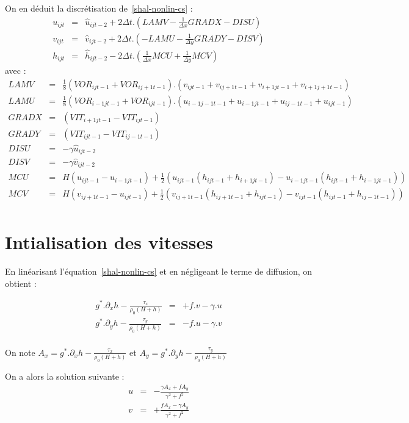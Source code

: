 \documentclass[a4paper,12pt]{article}
\begin{document}
On en déduit la discrétisation de~\ref{shal-nonlin-cs} :
\begin{eqnarray*}
u_{ijt} & = & \hat{u}_{ijt-2}+2\Delta t. (LAMV -  \frac{1}{\Delta x}GRADX - DISU ) \\
v_{ijt} & = & \hat{v}_{ijt-2}+2\Delta t. (- LAMU -  \frac{1}{\Delta y}GRADY - DISV ) \\
h_{ijt} & = & \hat{h}_{ijt-2}-2\Delta t . ( \frac{1}{\Delta x}MCU + \frac{1}{\Delta y}MCV)
\end{eqnarray*}
avec : 
\begin{eqnarray*}
LAMV & = & \frac{1}{8}(VOR_{ijt-1}+VOR_{ij+1t-1}).(v_{ijt-1}+v_{ij+1t-1}+v_{i+1jt-1}+v_{i+1j+1t-1})\\
LAMU & = & \frac{1}{8}(VOR_{i-1jt-1}+VOR_{ijt-1}).(u_{i-1j-1t-1}+u_{i-1jt-1}+u_{ij-1t-1}+u_{ijt-1})\\
GRADX & = &(VIT_{i+1jt-1}-VIT_{ijt-1})\\
GRADY & = &(VIT_{ijt-1}-VIT_{ij-1t-1})\\
DISU & = &  -\gamma                \hat{u}_{ijt-2}\\
DISV & = & -\gamma                \hat{v}_{ijt-2}\\
MCU  & = & H(u_{ijt-1} - u_{i-1jt-1}) + \frac{1}{2}
(u_{ijt-1}(h_{ijt-1}+h_{i+1jt-1}) - u_{i-1jt-1}(h_{ijt-1}+h_{i-1jt-1}))\\
MCV  & = & H(v_{ij+1t-1} - u_{ijt-1}) + \frac{1}{2}
(v_{ij+1t-1}(h_{ij+1t-1}+h_{ijt-1}) - v_{ijt-1}(h_{ijt-1}+h_{ij-1t-1}))\\
\end{eqnarray*}

\section{Intialisation des vitesses}
En linéarisant l'équation~\ref{shal-nonlin-cs} et en négligeant le terme de diffusion, on obtient :

\begin{eqnarray}
g^*.\partial_x h - \frac{\tau_x}{\rho_0(H+h)} & = & + f.v   - \gamma . u \nonumber \\
g^*.\partial_y h - \frac{\tau_y}{\rho_0(H+h)} & = & - f.u   - \gamma . v \nonumber  \label{eq-cs}\\
\end{eqnarray}

On note $A_x = g^*.\partial_x h - \frac{\tau_x}{\rho_0(H+h)}$ et
$A_y = g^*.\partial_y h - \frac{\tau_y}{\rho_0(H+h)}$

On a alors la solution suivante :
\begin{eqnarray}
u & = & - \frac{\gamma A_x + f A_y}{\gamma^2 + f^2} \nonumber \\
v & = & + \frac{f A_x - \gamma A_y}{\gamma^2 + f^2} \label{sol-eq}\\
\end{eqnarray}
\end{document}
